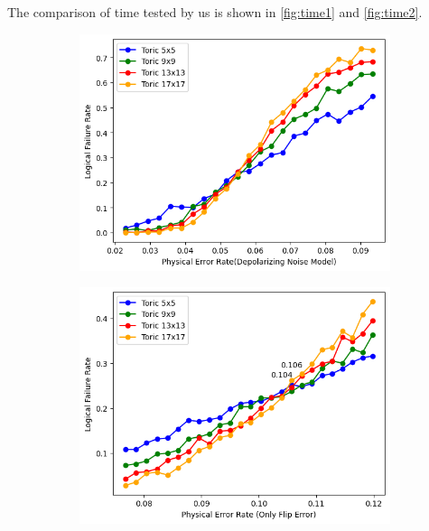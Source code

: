 \documentclass[
    a4paper, %
    10pt, %
    unnumberedsections, %
    twoside, %
]{LTJournalArticle}
\begin{document}
    The comparison of time tested by us is shown in \ref{fig:time1} and \ref{fig:time2}. 
    \begin{figure}[htbp] %
        \centering %
        \vspace{0cm} %
        \setlength{\abovecaptionskip}{0.cm} %
        \setlength{\belowcaptionskip}{0.cm} %
        \setlength{\belowdisplayskip}{3pt} %
        \begin{subfigure}[b]{0.9\linewidth}
            \includegraphics[width=\linewidth]{img/errorThres.png}
            \caption{}
            \label{fig:errorrate1}
        \end{subfigure}
        \hfill
        \begin{subfigure}[b]{0.9\linewidth}
            \includegraphics[width=\linewidth]{img/errorThres2.png}
            \caption{}
            \label{fig:errorate2}
        \end{subfigure}
        \caption{}
        \end{figure}
\end{document}

